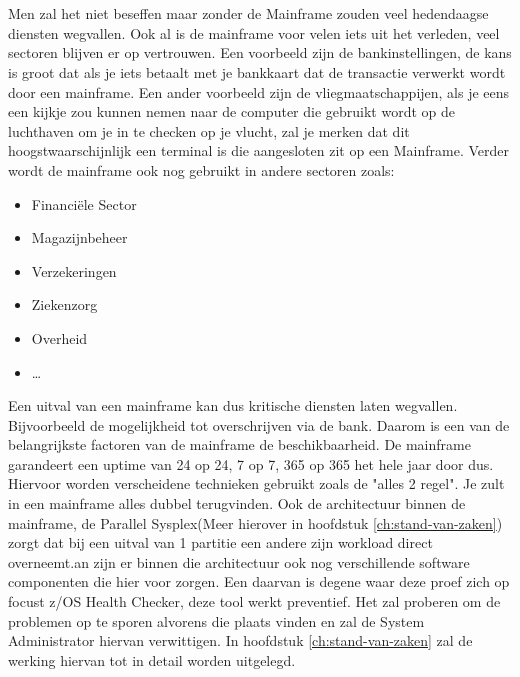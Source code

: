 
\chapter{}
\label{ch:inleiding}

Men zal het niet beseffen maar zonder de Mainframe zouden veel hedendaagse diensten wegvallen. Ook al is de mainframe voor velen iets uit het verleden, veel sectoren blijven er op vertrouwen. Een voorbeeld zijn de bankinstellingen, de kans is groot dat als je iets betaalt met je bankkaart dat de transactie verwerkt wordt door een mainframe. Een ander voorbeeld zijn de vliegmaatschappijen, als je eens een kijkje zou kunnen nemen naar de computer die gebruikt wordt op de luchthaven om je in te checken op je vlucht, zal je merken dat dit hoogstwaarschijnlijk een terminal is die aangesloten zit op een Mainframe. Verder wordt de mainframe ook nog gebruikt in andere sectoren zoals:


\begin{itemize}
  \item Financiële Sector
  \item Magazijnbeheer
  \item Verzekeringen
  \item Ziekenzorg
  \item Overheid
  \item \ldots
\end{itemize}

Een uitval van een mainframe kan dus kritische diensten laten wegvallen. Bijvoorbeeld de mogelijkheid tot overschrijven via de bank. Daarom is een van de belangrijkste factoren van de mainframe de beschikbaarheid. De mainframe garandeert een uptime van 24 op 24, 7 op 7, 365 op 365 het hele jaar door dus. Hiervoor worden verscheidene technieken gebruikt zoals de "alles 2 regel". Je zult in een mainframe alles dubbel terugvinden. Ook de architectuur binnen de mainframe, de Parallel Sysplex(Meer hierover in hoofdstuk \ref{ch:stand-van-zaken}) zorgt dat bij een uitval van 1 partitie een andere zijn workload direct overneemt.an zijn er binnen die architectuur ook nog verschillende software componenten die hier voor zorgen. Een daarvan is degene waar deze proef zich op focust z/OS Health Checker, deze tool werkt preventief. Het zal proberen om de problemen op te sporen alvorens die plaats vinden en zal de System Administrator hiervan verwittigen. In hoofdstuk \ref{ch:stand-van-zaken} zal de werking hiervan tot in detail worden uitgelegd.

